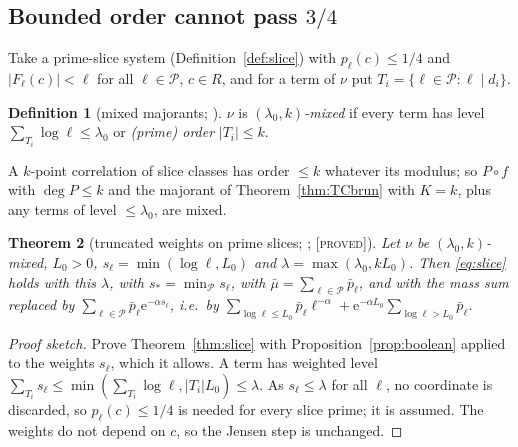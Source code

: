 \documentclass[10pt,reqno]{amsart}
\newtheorem{theorem}{Theorem}[section]
\theoremstyle{definition}
\newtheorem{definition}[theorem]{Definition}
\theoremstyle{remark}
\newcommand{\cP}{\mathcal P}
\newcommand{\e}{\mathrm e}
\newcommand{\lab}[1]{\textup{[\textsc{#1}]}}
\begin{document}
\subsection{Bounded order cannot pass \texorpdfstring{$3/4$}{3/4}}
Take a prime-slice system (Definition~\ref{def:slice}) with $p_\ell(c)\leq1/4$
and $|F_\ell(c)|<\ell$ for all $\ell\in\cP$, $c\in R$, and for a term of $\nu$ put
$T_i=\{\ell\in\cP:\ell\mid d_i\}$.

\begin{definition}[mixed majorants; {\cite[Def.~3.0]{TU}}]\label{def:mixed}
$\nu$ is \emph{$(\lambda_0,k)$-mixed} if every term has level
$\sum_{T_i}\log\ell\leq\lambda_0$ or \emph{(prime) order} $|T_i|\leq k$.
\end{definition}
A $k$-point correlation of slice classes has order $\leq k$ whatever its
modulus; so $P\circ f$ with $\deg P\leq k$ and the majorant of
Theorem~\ref{thm:TCbrun} with $K=k$, plus any terms of level $\leq\lambda_0$, are mixed.

\begin{theorem}[truncated weights on prime slices; {\cite[Thm~3.1]{TU}}; \lab{proved}]\label{thm:truncslice}
Let $\nu$ be $(\lambda_0,k)$-mixed, $L_0>0$, $s_\ell=\min(\log\ell,L_0)$ and
$\lambda=\max(\lambda_0,kL_0)$.  Then \eqref{eq:slice} holds with this $\lambda$, with
$s_*=\min_\cP s_\ell$, with $\bar\mu=\sum_{\ell\in\cP}\bar p_\ell$, and with the mass sum
replaced by $\sum_{\ell\in\cP}\bar p_\ell\e^{-\alpha s_\ell}$, i.e.\ by
$\sum_{\log\ell\leq L_0}\bar p_\ell\ell^{-\alpha}+\e^{-\alpha L_0}\sum_{\log\ell>L_0}\bar p_\ell$.
\end{theorem}
\begin{proof}[Proof sketch]
Prove Theorem~\ref{thm:slice} with Proposition~\ref{prop:boolean} applied
to the weights $s_\ell$, which it allows.  A term has weighted level
$\sum_{T_i}s_\ell\leq\min(\sum_{T_i}\log\ell,|T_i|L_0)\leq\lambda$.  As $s_\ell\leq\lambda$ for all $\ell$,
no coordinate is discarded, so $p_\ell(c)\leq1/4$ is needed for every slice
prime; it is assumed.  The weights do not depend on $c$, so the Jensen
step is unchanged.
\end{proof}
\end{document}
